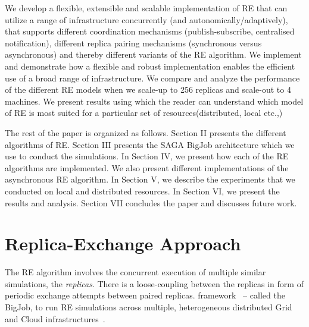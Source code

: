 \documentclass[a4paper,10pt]{article}
\newcommand{\jhanote}[1]{ {\textcolor{red} { ***shantenu: #1 }}}
\newcommand{\alnote}[1]{ {\textcolor{blue} { ***andre: #1 }}}
\newcommand{\alnote}[1]{}
\newcommand{\jhanote}[1]{}
\begin{document}
We develop a flexible, extensible and scalable
implementation of RE that can utilize a range of infrastructure
concurrently (and autonomically/adaptively), that supports different
coordination mechanisms (publish-subscribe, centralised notification),
different replica pairing mechanisms (synchronous versus asynchronous)
and thereby different variants of the RE algorithm. We implement and
demonstrate how a flexible and robust implementation enables the
efficient use of a broad range of infrastructure. We compare and analyze the performance of the different RE models when we scale-up to 256 replicas and scale-out to 4 machines. 
We present results using which the reader can understand which model of RE is most suited for a particular set of resources(distributed, local etc.,)

The rest of the paper is organized as follows. Section II presents the different algorithms of RE. Section III  presents the SAGA BigJob architecture which we use to conduct the simulations. In Section IV, we present how each of the RE algorithms are implemented. We also present different implementations of the asynchronous RE algorithm. In Section V, we describe the experiments that we conducted on local and distributed resources. In Section VI, we present the results and analysis. Section VII concludes the paper and discusses future work.

\section{Replica-Exchange Approach}
\label{sec:repex-approach}
The RE algorithm involves the concurrent execution of multiple similar
simulations, the \emph{replicas}.  There is a loose-coupling between
the replicas in form of periodic exchange attempts between paired
replicas. %
framework~\cite{saga_bigjob_condor_cloud} -- called the BigJob, to run
RE simulations across multiple, heterogeneous distributed Grid and
Cloud infrastructures~\cite{Luckow:2008fp}.
\end{document}
